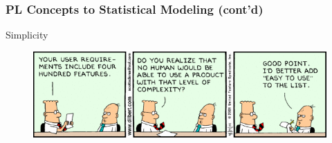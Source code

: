 \documentclass[usenames,dvipsnames]{beamer}
\begin{document}
\begin{frame}
  \frametitle{PL Concepts to Statistical Modeling (cont'd)}
  \begin{center}
    \LARGE Simplicity
  \end{center}
  \vspace{-0.5cm}
  \begin{figure}[ht]
    \centering
    \includegraphics[width=1.0\textwidth,height=0.65\textheight]{figures/simplicity.png}
    \caption*{\label{fig:simplicity}}
  \end{figure}
\end{frame}
\end{document}
